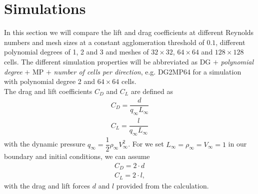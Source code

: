 \section{Simulations}
	In this section we will compare the lift and drag coefficients at different Reynolds numbers and mesh sizes at a constant agglomeration threshold of $0.1$, different polynomial degrees of 1, 2 and 3 and meshes of $32 \times 32$, $64 \times 64$ and $128 \times 128$ cells. The different simulation properties will be abbreviated as DG $+$ \textit{polynomial degree} $+$ MP $+$ \textit{number of cells per direction}, e.g. DG2MP64 for a simulation with polynomial degree 2 and $64 \times 64$ cells.\\
	 The drag and lift coefficients $C_D$ and $C_L$ are defined as
	\begin{align}
		C_D = \dfrac{d}{q_\infty L_\infty} \\
		C_L = \dfrac{l}{q_\infty L_\infty}
	\end{align}
	with the dynamic pressure $q_\infty = \dfrac{1}{2} \rho_\infty V_\infty^2$. For we set $L_\infty = \rho_\infty = V_\infty = 1$ in our boundary and initial conditions, we can assume
	\begin{align}
		C_D = 2 \cdot d \\
		C_L = 2 \cdot l,
	\end{align}
	with the drag and lift forces $d$ and $l$ provided from the calculation.
	
	
	
